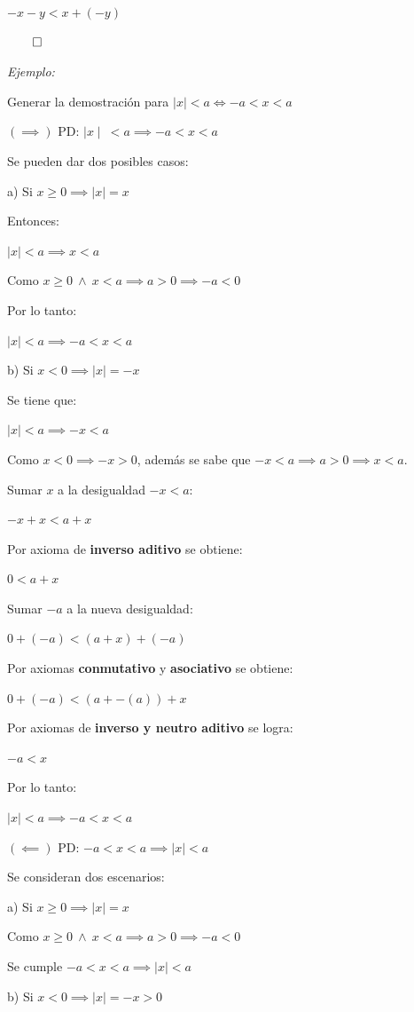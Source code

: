 \documentclass{article}
\begin{document}
$- x - y < x + (-y)$

$\qed$

\textit{Ejemplo:}

Generar la demostración para $\mid x \mid < a \iff - a < x < a$

$(\implies)$ PD: $\mid x \mid \ < a \implies -a < x < a$

Se pueden dar dos posibles casos:

a) Si $x \ge 0 \implies \mid x \mid = x$

Entonces:

$\mid x \mid < a \implies x < a$

Como $x \ge 0 \ \land \ x < a \implies a > 0 \implies -a < 0$

Por lo tanto:

$\mid x \mid < a \implies - a < x < a$

b) Si $x < 0 \implies \mid x \mid = - x$

Se tiene que:

$\mid x \mid < a \implies - x < a$

Como $x < 0 \implies - x > 0$, además se sabe que $- x < a \implies a > 0 \implies x < a$.

Sumar $x$ a la desigualdad $- x < a$:

$- x + x < a + x $

Por axioma de \textbf{inverso aditivo} se obtiene:

$0 < a + x$

Sumar $- a$ a la nueva desigualdad:

$0 + (-a) < (a + x) + (-a)$

Por axiomas \textbf{conmutativo} y \textbf{asociativo} se obtiene:

$0 + (-a) < (a + -(a)) + x$

Por axiomas de \textbf{inverso y neutro aditivo} se logra:

$-a < x$

Por lo tanto:

$\mid x \mid < a \implies -a < x < a$

$(\impliedby)$ PD: $-a <  x  < a \implies \mid x \mid < a$

Se consideran dos escenarios:

a) Si $x \ge 0 \implies \mid x \mid = x$

Como $x \ge 0 \ \land \ x < a \implies a > 0 \implies - a < 0$

Se cumple $-a < x < a \implies \mid x \mid < a$

b) Si $x < 0 \implies \mid x \mid = - x > 0$
\end{document}

